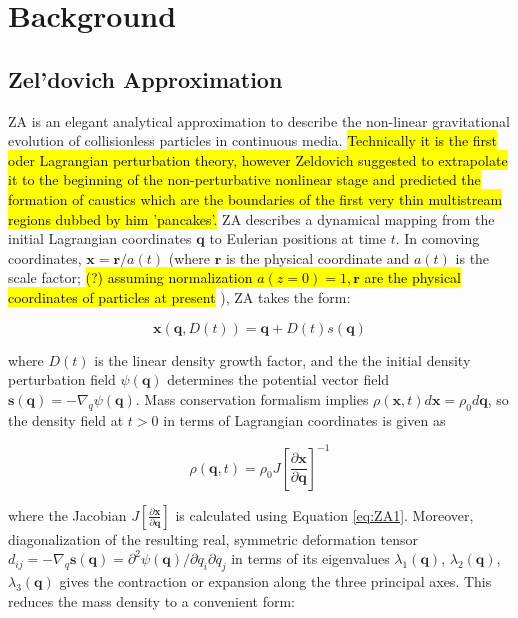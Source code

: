 \chapter{Background}

\section{Zel'dovich Approximation}

\label{sec:ZA}

ZA is an elegant analytical approximation to describe the non-linear gravitational evolution of collisionless particles in continuous media. \hl{Technically it is the first oder Lagrangian perturbation theory, however Zeldovich suggested to extrapolate it to the beginning of the non-perturbative nonlinear stage and predicted the formation of caustics which are the boundaries of
the first very thin multistream regions dubbed by him  'pancakes'.}
ZA describes a dynamical mapping from the initial Lagrangian coordinates $\mathbf{q}$ to Eulerian positions at time $t$. In comoving coordinates, $\mathbf{x} = \mathbf{r}/a(t)$ (where $\mathbf{r}$ is the physical coordinate  and $a(t)$ is the scale factor; \hl{(?) assuming normalization $a(z=0)=1, \mathbf{r}$ are 
the physical coordinates of particles at present} ), ZA takes the form:

\begin{equation} \label{eq:ZA1}
 \mathbf{x}(\mathbf{q}, D(t) ) = \mathbf{q} + D(t) s(\mathbf{q}) 
\end{equation}

where $D(t)$ is the linear density growth factor, and the the initial density perturbation field $\psi(\mathbf{q})$ determines the potential vector field $\mathbf{s(q)} = - \nabla_q \psi(\mathbf{q})$. 
Mass conservation formalism implies $\rho(\mathbf{x}, t) d\mathbf{x} = \rho_0 d\mathbf{q} $, so the density field at $t>0$ in terms of Lagrangian coordinates is given as 

\begin{equation}
 \rho(\mathbf{q}, t) = \rho_0 J \left[ \frac{\partial\mathbf{x}}{\partial\mathbf{q}} \right]^{-1}
\end{equation}

where the Jacobian $J \left[ \frac{\partial\mathbf{x}}{\partial\mathbf{q}} \right]$ is calculated using Equation \ref{eq:ZA1}. Moreover, diagonalization of the resulting real, symmetric deformation tensor $d_{ij} = - \nabla_q \mathbf{s(q)} =  \partial^2 \psi(\mathbf{q})/ \partial q_i \partial q_j$ in terms of its eigenvalues $\lambda_1(\mathbf{q})$, $\lambda_2(\mathbf{q})$, $\lambda_3(\mathbf{q})$ gives the contraction or expansion along the three principal axes. This reduces the mass density to a convenient form:

